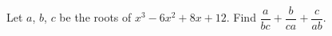 Let $a$, $b$, $c$ be the roots of $x^3-6x^2+8x+12$. Find $\dfrac{a}{bc}+\dfrac{b}{ca}+\dfrac{c}{ab}$.
